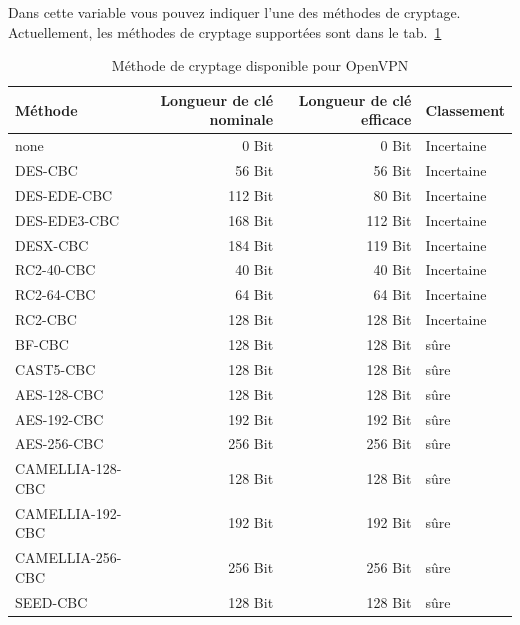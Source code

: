 \begin{description}


  Dans cette variable vous pouvez indiquer l'une des méthodes de cryptage. Actuellement,
  les méthodes de cryptage supportées sont dans le tab.~\ref{openvpn:ciphers}

  \begin{table}[!ht]
    \centering
    \caption{Méthode de cryptage disponible pour OpenVPN}
    \label{openvpn:ciphers}
    \begin{tabular}{|p{4cm}|r|r|l|}
      \hline
      Méthode & Longueur de clé nominale & Longueur de clé efficace & Classement \\
      \hline
      none             &   0 Bit &   0 Bit & Incertaine \\
      DES-CBC          &  56 Bit &  56 Bit & Incertaine \\
      DES-EDE-CBC      & 112 Bit &  80 Bit & Incertaine \\
      DES-EDE3-CBC     & 168 Bit & 112 Bit & Incertaine \\
      DESX-CBC         & 184 Bit & 119 Bit & Incertaine \\
      RC2-40-CBC       &  40 Bit &  40 Bit & Incertaine \\
      RC2-64-CBC       &  64 Bit &  64 Bit & Incertaine \\
      RC2-CBC          & 128 Bit & 128 Bit & Incertaine \\
      BF-CBC           & 128 Bit & 128 Bit & sûre \\
      CAST5-CBC        & 128 Bit & 128 Bit & sûre \\
      AES-128-CBC      & 128 Bit & 128 Bit & sûre \\
      AES-192-CBC      & 192 Bit & 192 Bit & sûre \\
      AES-256-CBC      & 256 Bit & 256 Bit & sûre \\
      CAMELLIA-128-CBC & 128 Bit & 128 Bit & sûre \\
      CAMELLIA-192-CBC & 192 Bit & 192 Bit & sûre \\
      CAMELLIA-256-CBC & 256 Bit & 256 Bit & sûre \\
      SEED-CBC         & 128 Bit & 128 Bit & sûre \\
      \hline
    \end{tabular}
  \end{table}


\end{description}
